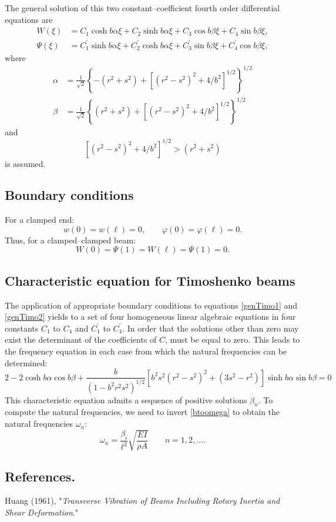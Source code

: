 \documentclass[11pt,a4paper]{article}
\begin{document}
The general solution of this two constant--coefficient fourth order differential equations are
\begin{align}
      \label{genTimo1}
      W(\xi)    & =C_1 \cosh b \alpha \xi+C_2 \sinh b \alpha \xi+C_3 \cos b \beta \xi +C_4 \sin b \beta \xi,                                              \\
      \Psi(\xi) & =C_{1}^{\prime} \sinh b \alpha \xi+C_{2}^{\prime} \cosh b \alpha \xi+C_{3 }^{\prime} \sin b \beta \xi +C_{4}^{\prime} \cos b \beta \xi,
      \label{genTimo2}
\end{align}
where
$$
      \begin{aligned}
            \alpha & =\frac{1}{\sqrt{ 2}}\left\{-\left(r^2+s^2\right)+\left[\left(r^2-s^2\right)^2+4 / b^2\right]^{1 / 2}\right\}^{1 / 2} \\
            \beta  & =\frac{1}{\sqrt{ 2} }\left\{\left(r^2+s^2\right)+\left[\left(r^2-s^2\right)^2+4 / b^2\right]^{1 / 2}\right\}^{1 / 2}
      \end{aligned}
$$
and
$$
      \left[\left(r^2-s^2\right)^2+4 / b^2\right]^{1 / 2}>\left(r^2+s^2\right)
$$
is assumed.

\subsection{Boundary conditions}
For a clamped end:
\[
      w(0)=w(\ell)= 0, \qquad \varphi (0)=\varphi(\ell)= 0.
\]
Thus, for a clamped--clamped beam:
\[
      W(0) = \Psi(1) = W(\ell) = \Psi(1) = 0.
\]

\subsection{Characteristic equation for Timoshenko beams}
The application of appropriate boundary conditions to equations \eqref{genTimo1} and \eqref{genTimo2} yields to a set of four homogeneous linear algebraic equations in four constants $C_{1}$ to $C_{4}$  and $C_{1}^\prime$ to $C_{4}^\prime$. In order that the solutions other than zero may exist the determinant of the coefficients of $C$, must be equal to zero. This leads to the frequency equation in each case from which the natural frequencies can be determined:
$$
      \boxed{2-2 \cosh b \alpha \cos b \beta +\frac{b}{\left(1-b^2 r^2 s^2\right)^{1 / 2}}
            \left[b^2 s^2\left(r^2-s^2\right)^2+\left(3 s^2-r^2\right)\right] \sinh b \alpha \sin b \beta=0}
$$
This characteristic equation admits a sequence of positive solutions $\beta_n$. To compute the natural frequencies, we need to invert \eqref{btoomega} to obtain the natural frequencies $\omega_n$:
\[
      \omega_n = \frac{\beta_i}{\ell^2} \sqrt{\frac{EI}{\rho A}} \qquad n=1,2,\ldots.
\]

\bigskip
\subsection*{References.}
Huang (1961), "\emph{Transverse Vibration of Beams Including Rotary Inertia and Shear Deformation}."
\end{document}
